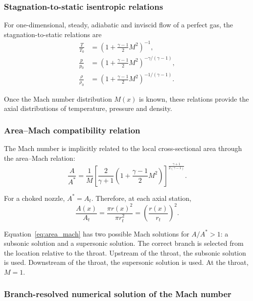 \documentclass[11pt,a4paper]{article}
\begin{document}
\subsubsection{Stagnation-to-static isentropic relations}

For one-dimensional, steady, adiabatic and inviscid flow of a perfect gas, the stagnation-to-static relations are
\begin{align}
\frac{T}{T_0} &= \left(1+\frac{\gamma-1}{2}M^2\right)^{-1},
\label{eq:T_T0}\\
\frac{p}{p_0} &= \left(1+\frac{\gamma-1}{2}M^2\right)^{-\gamma/(\gamma-1)},
\label{eq:p_p0}\\
\frac{\rho}{\rho_0} &= \left(1+\frac{\gamma-1}{2}M^2\right)^{-1/(\gamma-1)}.
\label{eq:rho_rho0}
\end{align}

Once the Mach number distribution $M(x)$ is known, these relations provide the axial distributions of temperature, pressure and density.

\subsubsection{Area--Mach compatibility relation}

The Mach number is implicitly related to the local cross-sectional area through the area--Mach relation:
\begin{equation}
\frac{A}{A^*}=\frac{1}{M}
\left[
\frac{2}{\gamma+1}
\left(1+\frac{\gamma-1}{2}M^2\right)
\right]^{\frac{\gamma+1}{2(\gamma-1)}} .
\label{eq:area_mach}
\end{equation}

For a choked nozzle, $A^*=A_t$. Therefore, at each axial station,
\begin{equation}
\frac{A(x)}{A_t}=\frac{\pi r(x)^2}{\pi r_t^2}=\left(\frac{r(x)}{r_t}\right)^2 .
\label{eq:area_ratio_local}
\end{equation}

Equation~\eqref{eq:area_mach} has two possible Mach solutions for $A/A^*>1$: a subsonic solution and a supersonic solution. The correct branch is selected from the location relative to the throat. Upstream of the throat, the subsonic solution is used. Downstream of the throat, the supersonic solution is used. At the throat, $M=1$.

\subsubsection{Branch-resolved numerical solution of the Mach number}
\end{document}
